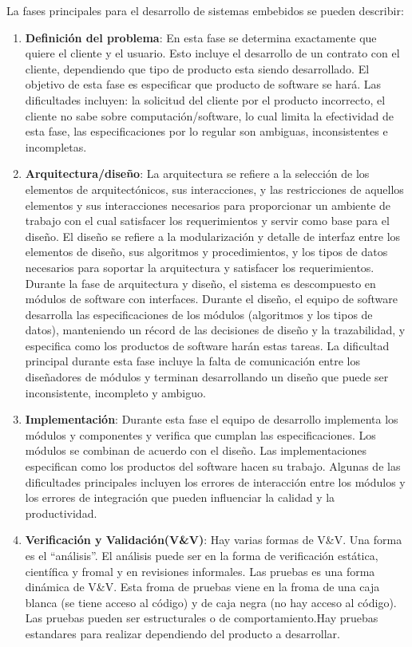 \documentclass[12pt,twoside]{book}
\begin{document}
La fases principales para el desarrollo de sistemas embebidos se pueden describir:
\begin{enumerate}
	\item \textbf{Definición del problema}: En esta fase se determina exactamente que quiere el cliente y el usuario. Esto incluye el desarrollo de un contrato con el cliente, dependiendo que tipo de producto esta siendo desarrollado. El objetivo de esta fase es especificar que producto de software se hará. Las dificultades incluyen: la solicitud del cliente por el producto incorrecto, el cliente no sabe sobre computación/software, lo cual limita la efectividad de esta fase, las especificaciones por lo regular son ambiguas, inconsistentes e incompletas.
	\item \textbf{Arquitectura/diseño}: La arquitectura se refiere a la selección de los elementos de arquitectónicos, sus interacciones, y las restricciones de aquellos elementos y sus interacciones necesarios para proporcionar un ambiente de trabajo con el cual satisfacer los requerimientos y servir como base para el diseño.  El diseño se refiere a la modularización y detalle de interfaz entre los elementos de diseño, sus algoritmos y procedimientos, y los tipos de datos necesarios para soportar la arquitectura y satisfacer los requerimientos. Durante la fase de arquitectura y diseño, el sistema es descompuesto en módulos de software con interfaces. Durante el diseño, el equipo de software desarrolla las especificaciones de los módulos (algoritmos y los tipos de datos),  manteniendo un récord de las decisiones de diseño y la trazabilidad, y especifica como los productos de software harán estas tareas. La dificultad principal durante esta fase incluye la falta de comunicación entre los diseñadores de módulos y terminan desarrollando un diseño que puede ser inconsistente, incompleto y ambiguo.
	\item \textbf{Implementación}: Durante esta fase el equipo de desarrollo implementa los módulos y componentes y verifica que cumplan las especificaciones. Los módulos se combinan de acuerdo con el diseño. Las implementaciones especifican como los productos del software hacen su trabajo. Algunas de las dificultades principales incluyen los errores de interacción entre los módulos y los errores de integración que pueden influenciar la calidad y la productividad.

	\item \textbf{Verificación y Validación(V\&V)}: Hay varias formas de V\&V. Una forma es el ``análisis''. El análisis puede ser en la forma de verificación estática, científica y fromal y en revisiones informales. Las pruebas es una forma dinámica de V\&V. Esta froma de pruebas viene en la froma de una caja blanca (se tiene acceso al código) y de caja negra (no hay acceso al código). Las pruebas pueden ser estructurales o de comportamiento.Hay pruebas estandares para realizar dependiendo del producto a desarrollar.
	 
\end{enumerate}
\end{document}
